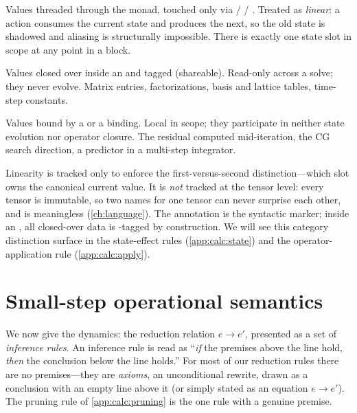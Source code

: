 \begin{description}[style=nextline, leftmargin=1.4em, font=\normalfont\itshape]
  \item[Simulator state.] Values threaded through the  monad, touched
  only via  /  / . Treated as \emph{linear}:
  a  action consumes the current state and produces the next, so the old
  state is shadowed and aliasing is structurally impossible. There is exactly one
  state slot in scope at any point in a  block.
  \item[Operator internal parameters.] Values closed over inside an
   and tagged \code{!} (shareable). Read-only across a solve;
  they never evolve. Matrix entries, factorizations, basis and lattice tables,
  time-step constants.
  \item[Ephemeral intermediates.] Values bound by a  or a 
  binding. Local in scope; they participate in neither state evolution nor
  operator closure. The residual computed mid-iteration, the CG search direction,
  a predictor in a multi-step integrator.
\end{description}

\noindent Linearity is tracked only to enforce the first-versus-second
distinction---which slot owns the canonical current value. It is \emph{not}
tracked at the tensor level: every tensor is immutable, so two names for one
tensor can never surprise each other, and  is meaningless
(\cref{ch:language}). The \code{!} annotation is the syntactic marker; inside an
, all closed-over data is \code{!}-tagged by construction. We
will see this category distinction surface in the state-effect rules
(\cref{app:calc:state}) and the operator-application rule
(\cref{app:calc:apply}).

\section{Small-step operational semantics}
\label{app:calc:reduction}

We now give the dynamics: the reduction relation $e \to e'$, presented as a set
of \emph{inference rules}. An inference rule is read as ``\emph{if} the premises
above the line hold, \emph{then} the conclusion below the line holds.'' For most
of our reduction rules there are no premises---they are \emph{axioms}, an
unconditional rewrite, drawn as a conclusion with an empty line above it (or
simply stated as an equation $e \to e'$). The pruning rule of
\cref{app:calc:pruning} is the one rule with a genuine premise.

